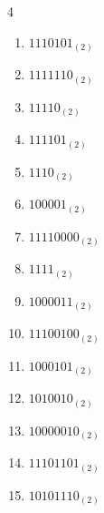 \begin{multicols}{4}
\begin{enumerate}
        \phantom{$=50$}

  \item $1110101_{(2)}$

        \phantom{$=117$}

\columnbreak %

  \item $1111110_{(2)}$

        \phantom{$=126$}

  \item $11110_{(2)}$

        \phantom{$=30$}

  \item $111101_{(2)}$

        \phantom{$=61$}

  \item $1110_{(2)}$

        \phantom{$=14$}

  \item $100001_{(2)}$

        \phantom{$=33$}

  \item $11110000_{(2)}$

        \phantom{$=240$}

  \item $1111_{(2)}$

        \phantom{$=15$}

  \item $1000011_{(2)}$

        \phantom{$=67$}

  \item $11100100_{(2)}$

        \phantom{$=228$}

  \item $1000101_{(2)}$

        \phantom{$=69$}

  \item $1010010_{(2)}$

        \phantom{$=82$}

  \item $10000010_{(2)}$

        \phantom{$=130$}

  \item $11101101_{(2)}$

        \phantom{$=237$}

  \item $10101110_{(2)}$


\end{enumerate}
\end{multicols}
